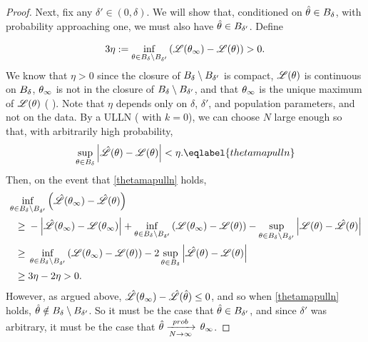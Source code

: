 \begin{lem}
\begin{proof}
Next, fix any $\delta' \in (0, \delta)$.  We will show that,
conditioned on $\hat\theta \in B_{\delta}$,
with probability approaching one,
we must also have $\hat\theta \in B_{\delta'}$.  Define

\def\annulusmap{\thetaball{\delta} \setminus \thetaball{\delta'}}
$$
3 \eta := \inf_{\theta \in \annulusmap} \left(\lik(\thetatrue) - \lik(\theta)\right) > 0.
$$
We know that $\eta > 0$ since the closure of $\annulusmap$ is compact,
$\mathscr{L}(\theta)$ is continuous on $B_{\delta}$,
$\theta_{\infty}$ is not in the closure of $\annulusmap$, and that
$\theta_{\infty}$ is the unique maximum of $\mathscr{L}(\theta)$
( ).  Note
that $\eta$ depends only on $\delta$, $\delta'$, and population parameters,
and not on the data. By a
ULLN ( with $k = 0$), we can choose $N$ large enough so that, with arbitrarily
high probability,
%
\begin{align}
\sup_{\theta \in \thetaball{\delta}} \abs{\likhat(\theta) - \lik(\theta)} < \eta.
\eqlabel{thetamapulln}
\end{align}
%
Then, on the event that \eqref{thetamapulln} holds,
$$
\begin{aligned}
\MoveEqLeft
\inf_{\theta \in \annulusmap} \left(\likhat(\thetatrue) - \likhat(\theta) \right)
\\\ge{}&
- \abs{\likhat(\thetatrue) - \lik(\thetatrue)} +
\inf_{\theta \in \annulusmap}
    \left(\lik(\thetatrue) - \lik(\theta) \right) -
\sup_{\theta \in \annulusmap}
    \abs{\lik(\theta) - \likhat(\theta)}
\\\ge{}&
\inf_{\theta \in \annulusmap}
    \left(\lik(\thetatrue) - \lik(\theta) \right) -
2 \sup_{\theta \in \thetaball{\delta}}
    \abs{\likhat(\theta) - \lik(\theta)}
\\\ge{}&
3 \eta - 2 \eta > 0.
\end{aligned}
$$
However, as argued above, $\hat{\mathscr{L}}(\theta_{\infty}) - \hat{\mathscr{L}}(\hat\theta) \le 0$,
and so when \eqref{thetamapulln} holds, $\thetahat \notin \annulusmap$.  So it
must be the case that $\hat\theta \in B_{\delta'}$, and since $\delta'$
was arbitrary, it must be the case that $\hat\theta \xrightarrow[N\rightarrow\infty]{prob}\, \theta_{\infty}$.


\end{proof}
\end{lem}
